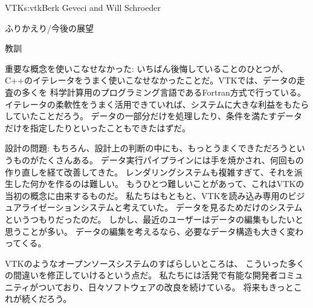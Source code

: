 \begin{aosachapter}{VTK}{s:vtk}{Berk Geveci and Will Schroeder}
\begin{aosasect1}{ふりかえり/今後の展望}
\begin{aosasect2}{教訓}
\begin{aosadescription}
  \item{重要な概念を使いこなせなかった}: いちばん後悔していることのひとつが、
  C++のイテレータをうまく使いこなせなかったことだ。VTKでは、データの走査の多くを
  科学計算用のプログラミング言語であるFortran方式で行っている。
  イテレータの柔軟性をうまく活用できていれば、システムに大きな利益をもたらしていたことだろう。
  データの一部分だけを処理したり、条件を満たすデータだけを指定したりといったこともできたはずだ。

  \item{設計の問題}: もちろん、設計上の判断の中にも、もっとうまくできただろうというものがたくさんある。
  データ実行パイプラインには手を焼かされ、何回もの作り直しを経て改善してきた。
  レンダリングシステムも複雑すぎて、それを派生した何かを作るのは難しい。
  もうひとつ難しいことがあって、これはVTKの当初の概念に由来するものだ。
  私たちはもともと、VTKを読み込み専用のビジュアライゼーションシステムと考えていた。
  データを見るためだけのシステムというつもりだったのだ。
  しかし、最近のユーザーはデータの編集もしたいと思うことが多い。
  データの編集を考えるなら、必要なデータ構造も大きく変わってくる。

\end{aosadescription}

VTKのようなオープンソースシステムのすばらしいところは、
こういった多くの間違いを修正していけるという点だ。
私たちには活発で有能な開発者コミュニティがついており、日々ソフトウェアの改良を続けている。
将来もきっとこれが続くだろう。

\end{aosasect2}

\end{aosasect1}

\end{aosachapter}

